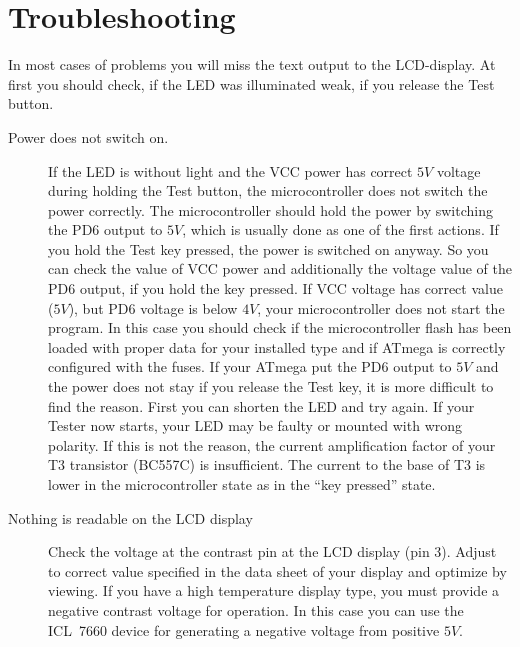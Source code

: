 \section{Troubleshooting}
In most cases of problems you will miss the text output to the LCD-display.
At first you should check, if the LED was illuminated weak, if you release
the Test button. 
\begin{description}

\item[Power does not switch on.]
If the LED is without light and the VCC power has correct
\(5V\) voltage during holding the Test button, the microcontroller does not switch the power
correctly. The microcontroller should hold the power by switching the
PD6 output to \(5V\), which is usually done as one of the first actions.
If you hold the Test key pressed, the power is switched on anyway.
So you can check the value of VCC power and additionally the voltage value
of the PD6 output, if you hold the key pressed.
If VCC voltage has correct value (\(5V\)), but PD6 voltage is
below \(4V\), your microcontroller does not start the program. In this case
you should check if the microcontroller flash has been loaded with proper data for your
installed type and if ATmega is correctly configured with the fuses.
If your ATmega put the PD6 output to \(5V\) and the power does not stay if you
release the Test key, it is more difficult to find the reason.
First you can shorten the LED and try again. If your Tester now starts,
your LED may be faulty or mounted with wrong polarity. If this is not
the reason, the current amplification factor of your T3 transistor (BC557C)
is insufficient. The current to the base of T3 is lower in the microcontroller
state as in the ``key pressed'' state.

\item[Nothing is readable on the LCD display]
Check the voltage at the contrast pin at the LCD display (pin 3). Adjust to
correct value specified in the data sheet of your display and optimize by viewing.
If you have a high temperature display type, you must provide a negative contrast voltage
for operation. In this case you can use the ICL~7660 device for generating
a negative voltage from positive \(5V\).


\end{description}
